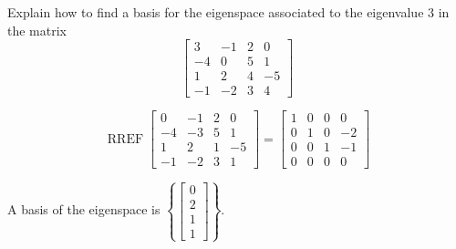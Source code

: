 
\begin{exerciseStatement}


Explain how to find a basis for the eigenspace associated to the eigenvalue \( 3 \) in the matrix \[ \left[\begin{array}{cccc}
3 & -1 & 2 & 0 \\
-4 & 0 & 5 & 1 \\
1 & 2 & 4 & -5 \\
-1 & -2 & 3 & 4
\end{array}\right] \]


\end{exerciseStatement}
    
\begin{exerciseAnswer} 


\[\operatorname{RREF} \left[\begin{array}{cccc}
0 & -1 & 2 & 0 \\
-4 & -3 & 5 & 1 \\
1 & 2 & 1 & -5 \\
-1 & -2 & 3 & 1
\end{array}\right] = \left[\begin{array}{cccc}
1 & 0 & 0 & 0 \\
0 & 1 & 0 & -2 \\
0 & 0 & 1 & -1 \\
0 & 0 & 0 & 0
\end{array}\right] \]



A basis of the eigenspace is \( \left\{ \left[\begin{array}{c}
0 \\
2 \\
1 \\
1
\end{array}\right] \right\} \).


\end{exerciseAnswer}
    
